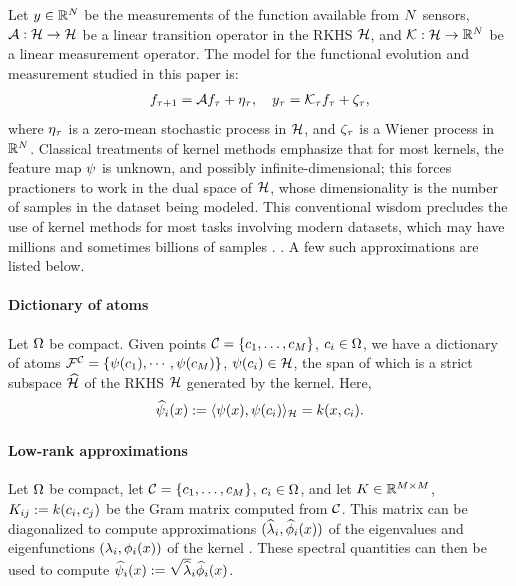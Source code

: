 Let $y\in\mathbb{R}^{N}$ be the measurements of the function available from $N$ sensors, $\mathcal{A}:\mathcal{H}\to\mathcal{H}$ be a linear transition operator in the RKHS $\mathcal{H}$, and $\mathcal{K}:\mathcal{H}\to\mathbb{R}^{N}$ be a linear measurement operator. The model for the functional evolution and measurement studied in this paper is:
\begin{align}\eqlabel{ideal_lin_evol}
 f_{\tindex+1} = \sysop f_{\tindex} + \eta_{\tindex}, \quad
 y_{\tindex} = \measop_{\tindex} f_{\tindex} + \zeta_{\tindex},
\end{align}
where $\eta_{\tau}$ is a zero-mean stochastic process in $\mathcal{H}$, and $\zeta_{\tau}$ is a Wiener process in $\mathbb{R}^{N}$. 
Classical treatments of kernel methods emphasize that for most kernels, the feature map $\psi$ is unknown, and possibly infinite-dimensional; this forces practioners to work in the dual space of $\mathcal{H}$, whose dimensionality is the number of samples in the dataset being modeled. This conventional wisdom precludes the use of kernel methods for most tasks involving modern datasets, which may have millions and sometimes billions of samples \cite{rahimi2007random}. . A few such approximations are listed below.
\paragraph{Dictionary of atoms} Let $\Omega$ be compact. Given points $\mathcal{C} = \{c_1,\dots,c_{M}\}$, $c_i\in\Omega$, we have a dictionary of atoms $\mathcal{F}^{\mathcal{C}} = \{\psi(c_1), \cdots , \psi(c_{M})\}$, $\psi(c_i)\in\mathcal{H}$, the span of which is a strict subspace $\widehat{\mathcal{H}}$ of the RKHS $\mathcal{H}$ generated by the kernel. Here, 
 \begin{equation}\eqlabel{fmap_dict}
 \fmapApprox_i(x) := \l\fmap(x), \fmap(c_i)\r_{\fspace} = \kernel(x, c_i).
 \end{equation}
\paragraph{Low-rank approximations} Let $\Omega$ be compact, let $\mathcal{C} = \{c_1,\dots,c_{M}\}$, $c_i\in\Omega$, and let $K\in\mathbb{R}^{M\times M}$, $K_{ij}:=k(c_i,c_j)$ be the Gram matrix computed from $\mathcal{C}$. This matrix can be diagonalized to compute approximations $(\widehat {\lambda}_i, \widehat \phi_i(x))$ of the eigenvalues and eigenfunctions $(\lambda_i, \phi_i(x))$ of the kernel \cite{williams2001using2}. These spectral quantities can then be used to compute  $ \widehat{\psi}_i(x):=\sqrt{\widehat {\lambda}}_i\widehat \phi_i(x)$.
